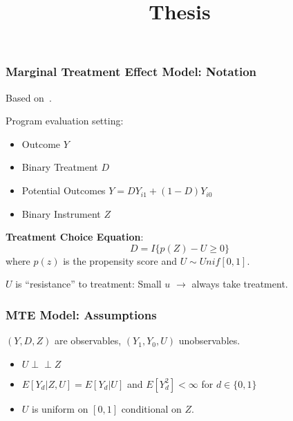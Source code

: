 \documentclass[11pt, aspectratio=169]{beamer}
\newcommand{\indep}{\perp\!\!\!\!\perp}
\begin{document}
\title{Thesis}



\begin{frame}
    \titlepage
    \note{~}
\end{frame}

\begin{frame}
    \frametitle{Marginal Treatment Effect Model: Notation}

    Based on~\cite{mogstad2018using}.

    \vspace{0.5cm}

    Program evaluation setting:
    \begin{itemize}
        \item Outcome $Y$
        \item Binary Treatment $D$
        \item Potential Outcomes $Y = D Y_{i1} + (1-D) Y_{i0}$
        \item Binary Instrument $Z$
    \end{itemize}

    \vspace{0.5cm}

    \textbf{Treatment Choice Equation}:
    \begin{equation}
        D = I\{p(Z) - U \geq 0\}
    \end{equation}
    where $p(z)$ is the propensity score and $U\sim Unif[0,1]$.

    \vspace{0.5cm}

    $U$ is ``resistance'' to treatment: Small $u$ $\rightarrow$ always take treatment.

\end{frame}

\begin{frame}
    \frametitle{MTE Model: Assumptions}
    $(Y,D,Z)$ are observables, $(Y_1, Y_0, U)$ unobservables.


    \begin{itemize}
        \item $U \indep Z$
        \item $E[Y_d|Z,U] = E[Y_d|U]$ and $E[Y_d^2] < \infty$ for $d \in \{0,1\}$
        \item $U$ is uniform on $[0,1]$ conditional on $Z$.
    \end{itemize}

\end{frame}
\end{document}
